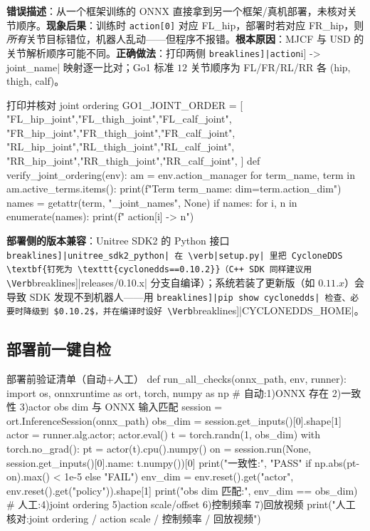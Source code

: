 \begin{pitfall}
\textbf{错误描述}：从一个框架训练的 ONNX 直接拿到另一个框架/真机部署，未核对关节顺序。\textbf{现象后果}：训练时 \verb|action[0]| 对应 FL\_hip，部署时若对应 FR\_hip，则\emph{所有}关节目标错位，机器人乱动——但程序不报错。\textbf{根本原因}：MJCF 与 USD 的关节解析顺序可能不同。\textbf{正确做法}：打印两侧 \Verb[breaklines]|action[i] -> joint_name| 映射逐一比对；Go1 标准 $12$ 关节顺序为 FL/FR/RL/RR 各 (hip, thigh, calf)。
\end{pitfall}

\begin{codebox}[Python]{打印并核对 joint ordering}
GO1_JOINT_ORDER = [
    "FL_hip_joint","FL_thigh_joint","FL_calf_joint",
    "FR_hip_joint","FR_thigh_joint","FR_calf_joint",
    "RL_hip_joint","RL_thigh_joint","RL_calf_joint",
    "RR_hip_joint","RR_thigh_joint","RR_calf_joint",
]
def verify_joint_ordering(env):
    am = env.action_manager
    for term_name, term in am.active_terms.items():
        print(f"Term {term_name}: dim={term.action_dim}")
        names = getattr(term, "_joint_names", None)
        if names:
            for i, n in enumerate(names):
                print(f"  action[{i}] -> {n}")
\end{codebox}

\begin{note}
\textbf{部署侧的版本兼容}：Unitree SDK2 的 Python 接口 \Verb[breaklines]|unitree_sdk2_python| 在 \verb|setup.py| 里把 CycloneDDS \textbf{钉死为 \texttt{cyclonedds==0.10.2}}（C++ SDK 同样建议用 \Verb[breaklines]|releases/0.10.x| 分支自编译）；系统若装了更新版（如 $0.11.x$）会导致 SDK 发现不到机器人——用 \Verb[breaklines]|pip show cyclonedds| 检查、必要时降级到 $0.10.2$，并在编译时设好 \Verb[breaklines]|CYCLONEDDS_HOME|。
\end{note}

\subsection{部署前一键自检}

\begin{codebox}[Python]{部署前验证清单（自动+人工）}
def run_all_checks(onnx_path, env, runner):
    import os, onnxruntime as ort, torch, numpy as np
    # 自动:1)ONNX 存在 2)一致性 3)actor obs dim 与 ONNX 输入匹配
    session = ort.InferenceSession(onnx_path)
    obs_dim = session.get_inputs()[0].shape[1]
    actor = runner.alg.actor; actor.eval()
    t = torch.randn(1, obs_dim)
    with torch.no_grad():
        pt = actor(t).cpu().numpy()
    on = session.run(None, {session.get_inputs()[0].name: t.numpy()})[0]
    print("一致性:", "PASS" if np.abs(pt-on).max() < 1e-5 else "FAIL")
    env_dim = env.reset().get("actor", env.reset().get("policy")).shape[1]
    print("obs dim 匹配:", env_dim == obs_dim)
    # 人工:4)joint ordering 5)action scale/offset 6)控制频率 7)回放视频
    print("人工核对:joint ordering / action scale / 控制频率 / 回放视频")
\end{codebox}

